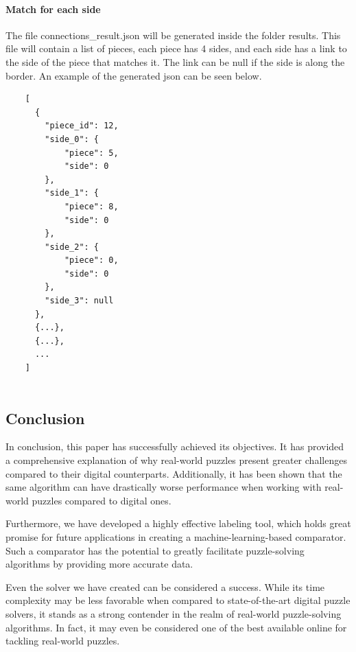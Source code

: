 \documentclass{article}
\begin{document}
\paragraph{Match for each side}
The file connections\_result.json will be generated
inside the folder results. This file will contain a list of pieces,
each piece has 4 sides, and each side has a link to the side of the piece
that matches it. The link can be null if the side is along the border.\newline
An example of the generated json can be seen below.


\begin{minipage}{\textwidth}
  \begin{lstlisting}
    [
      {
        "piece_id": 12,
        "side_0": {
            "piece": 5,
            "side": 0
        },
        "side_1": {
            "piece": 8,
            "side": 0
        },
        "side_2": {
            "piece": 0,
            "side": 0
        },
        "side_3": null
      },
      {...},
      {...},
      ...
    ]
  
  \end{lstlisting}
\end{minipage}

\subsection{Conclusion}

In conclusion, this paper has successfully achieved its objectives.
It has provided a comprehensive explanation of why real-world puzzles
present greater challenges compared to their digital counterparts.
Additionally, it has been shown that the same algorithm can have drastically worse
performance when working with real-world puzzles compared to digital ones.

Furthermore, we have developed a highly effective labeling tool,
which holds great promise for future applications in creating a
machine-learning-based comparator. Such a comparator has the potential
to greatly facilitate puzzle-solving algorithms by providing more
accurate data.

Even the solver we have created can be considered a success.
While its time complexity may be less favorable when compared to state-of-the-art
digital puzzle solvers, it stands as a strong contender in the realm of
real-world puzzle-solving algorithms. In fact, it may even be considered
one of the best available online for tackling real-world puzzles.
\end{document}
